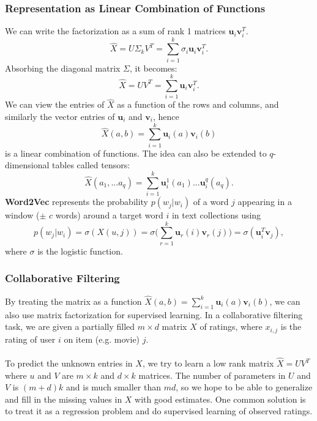 \documentclass{article}
\begin{document}
   \subsubsection{Representation as Linear Combination of Functions}
   We can write the factorization as a sum of rank 1 matrices $\mathbf{u}_i \mathbf{v}_i^T$.
   \begin{equation}
   \hat{X} = U \Sigma_k V^T = \sum_{i=1}^k \sigma_i \mathbf{u}_i \mathbf{v}_i^T.
   \end{equation}
   Absorbing the diagonal matrix $\Sigma$, it becomes:
   \begin{equation}
   \hat{X} = UV^T = \sum_{i=1}^k \mathbf{u}_i \mathbf{v}_i^T.
   \end{equation}
   We can view the entries of $\hat{X}$ as a function of the rows and columns, and similarly the vector entries of $\mathbf{u}_i$ and $\mathbf{v}_i$, hence
   \begin{equation}
   \hat{X}(a,b) = \sum_{i=1}^k \mathbf{u}_i(a) \mathbf{v}_i(b)
   \end{equation}
   is a linear combination of functions. The idea can also be extended to $q$-dimensional tables called tensors:
   \begin{equation}
   \hat{X}(a_1,...a_q) = \sum_{i=1}^k \mathbf{u}_i^1(a_1)...\mathbf{u}_i^q(a_q).
   \end{equation}
   \textbf{Word2Vec}\cite{mikolov2013distributed} represents the probability $p(w_j|w_i)$ of a word $j$ appearing in a window ($\pm$ $c$ words) around a target word $i$ in text collections using 
   \begin{equation}
   p(w_j|w_i) = \sigma (X(u,j)) = \sigma \Bigg( \sum_{r=1}^k \mathbf{u}_r(i) \mathbf{v}_r(j) \Bigg) = \sigma (\mathbf{u}_i^T \mathbf{v}_j),
   \end{equation}
   where $\sigma$ is the logistic function.
   
   \subsubsection{Collaborative Filtering}
   By treating the matrix as a function $\hat{X}(a,b) = \sum_{i=1}^k \mathbf{u}_i(a) \mathbf{v}_i(b)$, we can also use matrix factorization for supervised learning. In a collaborative filtering task, we are given a partially filled $m \times d$ matrix $X$ of ratings, where $x_{i,j}$ is the rating of user $i$ on item (e.g. movie) $j$. 
   \\\\
   To predict the unknown entries in $X$, we try to learn a low rank matrix $\hat{X}=UV^T$ where $u$ and $V$ are $m \times k$ and $d \times k$ matrices. The number of parameters in $U$ and $V$ is $(m+d)k$ and is much smaller than $md$, so we hope to be able to generalize and fill in the missing values in $X$ with good estimates. One common solution is to treat it as a regression problem and do supervised learning of observed ratings.
   
\end{document}
